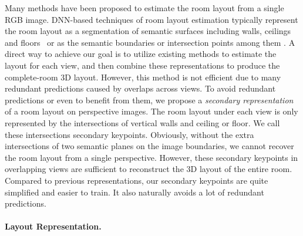 Many methods have been proposed to estimate the room layout from a single RGB image. 
DNN-based techniques of room layout estimation typically represent the room layout as a segmentation of semantic surfaces including walls, ceilings and floors~\cite{Delay, ours} or as the semantic boundaries or intersection points among them \cite{CFILE}. 
A direct way to achieve our goal is to utilize existing methods to estimate the layout for each view, and then combine these representations to produce the complete-room 3D layout. 
However, this method is not efficient due to many redundant predictions caused by overlaps across views. 
To avoid redundant predictions or even to benefit from them, we propose a \emph{secondary representation} of a room layout on perspective images. The room layout under each view is only represented by the intersections of vertical walls and ceiling or floor. We call these intersections secondary keypoints. 
Obviously, without the extra intersections of two semantic planes on the image boundaries, we cannot recover the room layout from a single perspective. However, these secondary keypoints in overlapping views are sufficient to reconstruct the 3D layout of the entire room. Compared to previous representations, our secondary keypoints are quite simplified and easier to train. It also naturally avoids a lot of redundant predictions. 

\paragraph{Layout Representation.}
 

